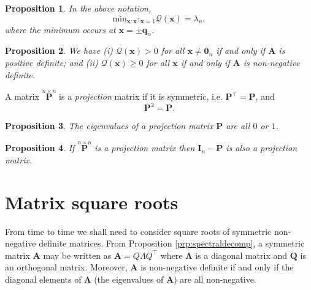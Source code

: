 \documentclass[]{book}
\newtheorem{proposition}{Proposition}[chapter]
\theoremstyle{definition}
\theoremstyle{definition}
\theoremstyle{definition}
\theoremstyle{remark}
\begin{document}
\begin{proposition}
\protect\hypertarget{prp:unnamed-chunk-6}{}{\label{prp:unnamed-chunk-6} }In the above notation,
\[\displaystyle{\text{min}_{{\mathbf x}:{\mathbf x}^\top {\mathbf x}=1}} \mathcal{Q}({\mathbf x})=\lambda_n,\]
where the minimum occurs at \(\boldsymbol x= \pm \boldsymbol q_n\).
\end{proposition}

\begin{proposition}
\protect\hypertarget{prp:unnamed-chunk-7}{}{\label{prp:unnamed-chunk-7} }We have (i) \(\mathcal{Q}(\boldsymbol x)>0\) for all
\(\boldsymbol x\neq {\mathbf 0}_n\) if and only if \(\mathbf A\) is positive definite; and
(ii) \(\mathcal{Q}(\boldsymbol x)\geq 0\) for all \(\boldsymbol x\) if and only if \(\boldsymbol A\) is non-negative definite.
\end{proposition}

A matrix \(\stackrel{n \times n}{\boldsymbol P}\) is a \emph{projection}
matrix if it is symmetric, i.e. \(\boldsymbol P^\top =\boldsymbol P\), and
\[
\boldsymbol P^2 =\boldsymbol P.
\]

\begin{proposition}
\protect\hypertarget{prp:unnamed-chunk-8}{}{\label{prp:unnamed-chunk-8} }The eigenvalues of a projection matrix \(\boldsymbol P\) are all \(0\) or \(1\).
\end{proposition}

\begin{proposition}
\protect\hypertarget{prp:unnamed-chunk-9}{}{\label{prp:unnamed-chunk-9} }If \(\stackrel{n \times n}{\boldsymbol P}\) is a projection matrix then \({\mathbf I}_n - \boldsymbol P\) is also
a projection matrix.
\end{proposition}

\hypertarget{matrix-square-roots}{%
\section{Matrix square roots}\label{matrix-square-roots}}

From time to time we shall need to consider square roots of symmetric non-negative definite matrices. From Proposition \ref{prp:spectraldecomp}, a symmetric
matrix \(\mathbf A\) may be written as
\(\mathbf A=Q \Lambda Q^\top\) where \(\mathbf \Lambda\) is a diagonal matrix and \(\mathbf Q\) is an orthogonal matrix. Moreover, \(\boldsymbol A\) is non-negative definite if and only if the diagonal elements of \(\mathbf \Lambda\) (the
eigenvalues of \(\mathbf A\)) are all non-negative.
\end{document}
